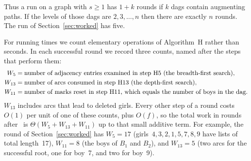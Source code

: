 Thus a run on a graph with $s\ge1$ has $1+k$ rounds if $k$ dags contain
augmenting paths. If the levels of those dags are $2,3,\ldots,n$ then
there are exactly $n$ rounds. The run of Section~\ref{sec:worked} has
five.

For running times we count elementary operations of Algorithm~H rather
than seconds. In each successful round we record three counts, named
after the steps that perform them:
\begin{align*}
  W_5&=\text{number of adjacency entries examined in step~\textup{H5} (the breadth-first search)},\\
  W_{13}&=\text{number of arcs consumed in step~\textup{H13} (the depth-first search)},\\
  W_{11}&=\text{number of marks reset in step~\textup{H11}, which equals the number of boys in the dag.}
\end{align*}
$W_{13}$ includes arcs that lead to deleted girls. Every other step of a
round costs $O(1)$ per unit of one of these counts, plus $O(f)$, so the
total work in rounds after~ is $\Theta(W_5+W_{13}+W_{11})$ up to that
small additive term. For example, the round of Section~\ref{sec:worked}
has $W_5=17$ (girls~$4,3,2,1,5,7,8,9$ have lists of total length~17),
$W_{11}=8$ (the boys of $B_1$ and $B_2$), and $W_{13}=5$ (two arcs for the
successful root, one for boy~7, and two for boy~9).
